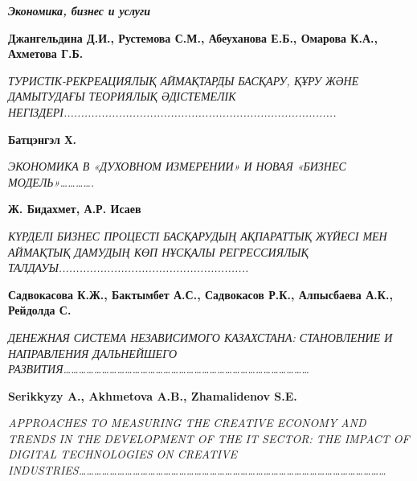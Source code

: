 \emph{{\bfseries Экономика, бизнес и услуги}}

{\bfseries Джангельдина Д.И., Рустемова С.М., Абеуханова Е.Б., Омарова
К.А., Ахметова Г.Б.}

\emph{ТУРИСТІК-РЕКРЕАЦИЯЛЫҚ АЙМАҚТАРДЫ БАСҚАРУ, ҚҰРУ ЖӘНЕ ДАМЫТУДАҒЫ
ТЕОРИЯЛЫҚ ӘДІСТЕМЕЛІК
НЕГІЗДЕРІ...............................................................................}

{\bfseries Батцэнгэл Х.}

\emph{ЭКОНОМИКА В «ДУХОВНОМ ИЗМЕРЕНИИ» И НОВАЯ «БИЗНЕС
МОДЕЛЬ»\ldots\ldots\ldots\ldots.}

{\bfseries Ж. Бидахмет, А.Р. Исаев}

\emph{КҮРДЕЛІ БИЗНЕС ПРОЦЕСТІ БАСҚАРУДЫҢ АҚПАРАТТЫҚ ЖҮЙЕСІ МЕН АЙМАҚТЫҚ
ДАМУДЫҢ КӨП НҰСҚАЛЫ РЕГРЕССИЯЛЫҚ
ТАЛДАУЫ.......................................................}

{\bfseries Садвокасова К.Ж., Бактымбет А.С., Садвокасов Р.К., Алпысбаева
А.К., Рейдолда С.}

\emph{ДЕНЕЖНАЯ СИСТЕМА НЕЗАВИСИМОГО КАЗАХСТАНА: СТАНОВЛЕНИЕ И
НАПРАВЛЕНИЯ ДАЛЬНЕЙШЕГО
РАЗВИТИЯ\ldots\ldots\ldots\ldots\ldots\ldots\ldots\ldots\ldots\ldots\ldots\ldots\ldots\ldots\ldots\ldots\ldots\ldots\ldots\ldots\ldots\ldots\ldots\ldots\ldots\ldots\ldots\ldots\ldots\ldots\ldots\ldots{}}

{\bfseries Serikkyzy A., Akhmetova A.B., Zhamalidenov S.E.}

\emph{APPROACHES TO MEASURING THE CREATIVE ECONOMY AND TRENDS IN THE
DEVELOPMENT OF THE IT SECTOR: THE IMPACT OF DIGITAL TECHNOLOGIES ON
CREATIVE
INDUSTRIES\ldots\ldots\ldots\ldots\ldots\ldots\ldots\ldots\ldots\ldots\ldots\ldots\ldots\ldots\ldots\ldots\ldots\ldots\ldots\ldots\ldots\ldots\ldots\ldots\ldots\ldots\ldots\ldots\ldots\ldots\ldots\ldots\ldots\ldots\ldots\ldots\ldots\ldots\ldots\ldots{}}

